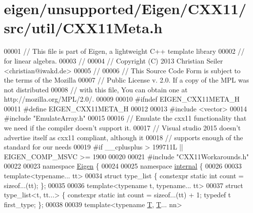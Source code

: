 \hypertarget{eigen_2unsupported_2_eigen_2_c_x_x11_2src_2util_2_c_x_x11_meta_8h_source}{}\section{eigen/unsupported/\+Eigen/\+C\+X\+X11/src/util/\+C\+X\+X11\+Meta.h}
\label{eigen_2unsupported_2_eigen_2_c_x_x11_2src_2util_2_c_x_x11_meta_8h_source}

\begin{DoxyCode}
00001 \textcolor{comment}{// This file is part of Eigen, a lightweight C++ template library}
00002 \textcolor{comment}{// for linear algebra.}
00003 \textcolor{comment}{//}
00004 \textcolor{comment}{// Copyright (C) 2013 Christian Seiler <christian@iwakd.de>}
00005 \textcolor{comment}{//}
00006 \textcolor{comment}{// This Source Code Form is subject to the terms of the Mozilla}
00007 \textcolor{comment}{// Public License v. 2.0. If a copy of the MPL was not distributed}
00008 \textcolor{comment}{// with this file, You can obtain one at http://mozilla.org/MPL/2.0/.}
00009 
00010 \textcolor{preprocessor}{#ifndef EIGEN\_CXX11META\_H}
00011 \textcolor{preprocessor}{#define EIGEN\_CXX11META\_H}
00012 
00013 \textcolor{preprocessor}{#include <vector>}
00014 \textcolor{preprocessor}{#include "EmulateArray.h"}
00015 
00016 \textcolor{comment}{// Emulate the cxx11 functionality that we need if the compiler doesn't support it.}
00017 \textcolor{comment}{// Visual studio 2015 doesn't advertise itself as cxx11 compliant, although it}
00018 \textcolor{comment}{// supports enough of the standard for our needs}
00019 \textcolor{preprocessor}{#if \_\_cplusplus > 199711L || EIGEN\_COMP\_MSVC >= 1900}
00020 
00021 \textcolor{preprocessor}{#include "CXX11Workarounds.h"}
00022 
00023 \textcolor{keyword}{namespace }\hyperlink{namespace_eigen}{Eigen} \{
00024 
00025 \textcolor{keyword}{namespace }\hyperlink{namespaceinternal}{internal} \{
00026 
00033 \textcolor{keyword}{template}<\textcolor{keyword}{typename}... tt>
00034 \textcolor{keyword}{struct }type\_list \{ constexpr \textcolor{keyword}{static} \textcolor{keywordtype}{int} count = \textcolor{keyword}{sizeof}...(tt); \};
00035 
00036 \textcolor{keyword}{template}<\textcolor{keyword}{typename} t, \textcolor{keyword}{typename}... tt>
00037 \textcolor{keyword}{struct }type\_list<t, tt...> \{ constexpr \textcolor{keyword}{static} \textcolor{keywordtype}{int} count = \textcolor{keyword}{sizeof}...(tt) + 1; \textcolor{keyword}{typedef} t first\_type; \};
00038 
00039 \textcolor{keyword}{template}<\textcolor{keyword}{typename} \hyperlink{group___sparse_core___module_class_eigen_1_1_triplet}{T}, \hyperlink{group___sparse_core___module_class_eigen_1_1_triplet}{T}... nn>

\end{DoxyCode}
